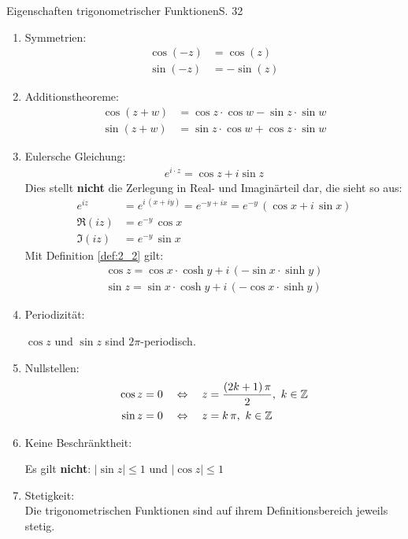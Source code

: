 \begin{bemerkung}{Eigenschaften trigonometrischer Funktionen}{S. 32}
  \begin{enumerate}
    \item Symmetrien:
      \begin{align}
        \cos(-z) &= \cos(z)\\
        \sin(-z) &= - \sin(z)
      \end{align}
    \item Additionstheoreme:
      \begin{align}
        \cos(z+w) &= \cos z \cdot \cos w - \sin z \cdot \sin w\\
        \sin(z+w) &= \sin z \cdot \cos w + \cos z \cdot \sin w
      \end{align}
    \item Eulersche Gleichung:
      \begin{align}
        e ^{i \cdot z} = \cos z + i \sin z
      \end{align}
      Dies stellt \textbf{nicht} die Zerlegung in Real- und Imaginärteil dar, die sieht so aus:
      \begin{align}
        e^{iz} &= e^{i \, (x+iy)} = e^{-y + ix} = e^{-y} \, \left( \cos x + i \, \sin x \right)\\
        \Re(iz) &= e^{-y} \, \cos x\\
        \Im(iz) &= e^{-y} \, \sin x
      \end{align}
      Mit Definition \ref{def:2_2} gilt:
      \begin{align}
        \cos z = \cos x \cdot \cosh y + i \, (- \sin x \cdot \sinh y)\\
        \sin z = \sin x \cdot \cosh y + i \, (- \cos x \cdot \sinh y)
      \end{align}
    \item Periodizität:\\
      \begin{center}
        \vspace{-\baselineskip}
        $\cos z$ und $\sin z$ sind $2\pi$-periodisch.
      \end{center}
    \item Nullstellen:
      \begin{align}
        \cos z = 0 \quad &\Leftrightarrow \quad z = \frac{(2k + 1) \, \pi}{2}, \ k \in \mathbb{Z}\\
        \sin z = 0 \quad &\Leftrightarrow \quad z = k \, \pi, \ k \in \mathbb{Z}
      \end{align}
    \item Keine Beschränktheit:\\
      \begin{center}
        \vspace{-\baselineskip}
        Es gilt \textbf{nicht}: $|\sin z| \leq 1$ und $|\cos z| \leq 1$
      \end{center}
    \item Stetigkeit:\\
      Die trigonometrischen Funktionen sind auf ihrem Definitionsbereich jeweils stetig.
  \end{enumerate}
\end{bemerkung}



